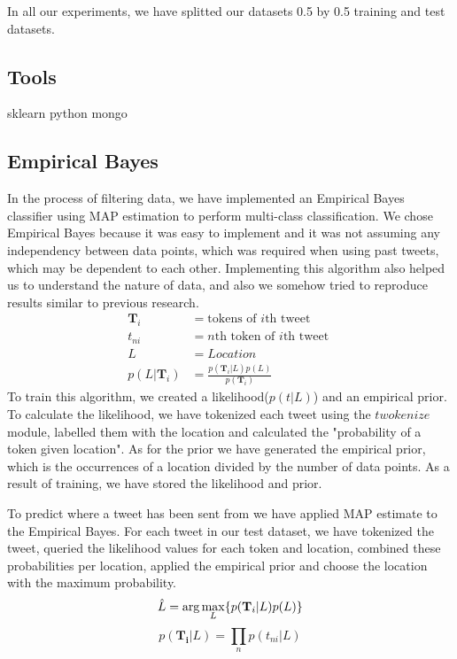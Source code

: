 \documentclass[twoside,11pt]{article}
\begin{document}
In all our experiments, we have splitted our datasets 0.5 by 0.5 training and test datasets.
\subsection{Tools}
sklearn python mongo



\subsection{Empirical Bayes}

In the process of filtering data, we have implemented an Empirical Bayes\cite{carlin1997bayes} classifier using MAP estimation\cite{degrooth} to perform multi-class classification. We chose Empirical Bayes because it was easy to implement and it was not assuming any independency between data points, which was required when using past tweets, which may be dependent to each other. Implementing this algorithm also helped us to understand the nature of data, and also we somehow tried to reproduce results similar to previous research.
\begin{equation*}
\begin{split}
\mathbf{T}_i & = \text{tokens of $i$th tweet }\\
t_{ni} & = \text{$n$th token of $i$th tweet }\\
L &= Location \\
p(L|\mathbf{T}_i) &= \frac{p(\mathbf{T}_i | L)p(L)}{p(\mathbf{T}_{i})} 
\end{split}
\end{equation*}
To train this algorithm, we created a likelihood($p(t | L)$) and an empirical prior. To calculate the likelihood, we have tokenized each tweet using the $twokenize$ module\cite{gimpel2011part}, labelled them with the location and calculated the "probability of a token given location". As for the prior we have generated the empirical prior, which is the occurrences of a location divided by the number of data points. As a result of training, we have stored the likelihood and prior.

To predict where a tweet has been sent from we have applied MAP estimate to the Empirical Bayes. For each tweet in our test dataset, we have tokenized the tweet, queried the likelihood values for each token and location, combined these probabilities per location, applied the empirical prior and choose the location with the maximum probability.
\begin{equation*}
\hat{L} = \arg\max_L\{p(\mathbf{T}_i | L) p(L)\}\\
\end{equation*}
\begin{equation*}
p(\mathbf{T_i} | L) = \prod_n{p(t_{ni}|L)}
\end{equation*}
\end{document}
